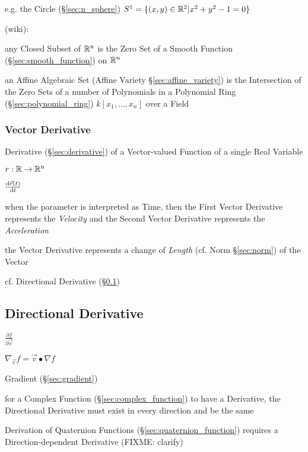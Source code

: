 e.g. the Circle (\S\ref{sec:n_sphere}) $S^1 = \{ (x,y) \in \mathbb{R}^2 | x^2 + y^2
- 1 = 0 \}$

(wiki):

any Closed Subset of $\mathbb{R}^n$ is the Zero Set of a Smooth Function
(\S\ref{sec:smooth_function}) on $\mathbb{R}^n$

an Affine Algebraic Set (Affine Variety \S\ref{sec:affine_variety}) is the
Intersection of the Zero Sets of a number of Polynomials in a Polynomial Ring
(\S\ref{sec:polynomial_ring}) $k[x_1,\ldots,x_n]$ over a Field



\subsubsection{Vector Derivative}\label{sec:vector_derivative}

Derivative (\S\ref{sec:derivative}) of a Vector-valued Function of a single Real
Variable

$r : \mathbb{R} \rightarrow \mathbb{R}^n$

$\frac{\mathrm{d}\vec{r}(t)}{\mathrm{d}t}$

when the parameter is interpreted as Time, then the First Vector Derivative
represents the \emph{Velocity} and the Second Vector Derivative represents the
\emph{Acceleration}

the Vector Derivative represents a change of \emph{Length} (cf. Norm
\S\ref{sec:norm}) of the Vector

cf. Directional Derivative (\S\ref{sec:directional_derivative})



\subsection{Directional Derivative}\label{sec:directional_derivative}

$\frac{\partial{f}}{\partial{\vec{v}}}$

$\nabla_{\vec{v}} f = \vec{v}\bullet \nabla{f}$

Gradient (\S\ref{sec:gradient})

for a Complex Function (\S\ref{sec:complex_function}) to have a Derivative, the
Directional Derivative must exist in every direction and be the same

Derivation of Quaternion Functions (\S\ref{sec:quaternion_function}) requires a
Direction-dependent Derivative (FIXME: clarify)

